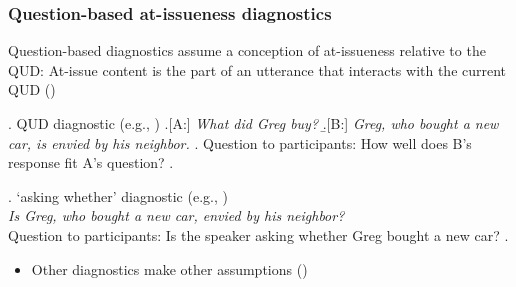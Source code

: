 \documentclass[compress, xcolor = dvipsnames, aspectratio=169]{beamer}
\begin{document}
	\begin{frame}[t]\frametitle{Question-based at-issueness diagnostics}\small

		Question-based diagnostics assume a conception of at-issueness relative to the QUD: At-issue content is the part of an utterance that interacts with the current QUD (\citealt{amaral_review_2007,simons_what_2010})\pause

		\ex. \label{qud}%
		    QUD diagnostic (e.g., \citealt{tonhauser_diagnosing_2012,chen_presuppositions_2024})
		    \a.[A:] \emph{What did Greg buy?}
		    \b.[B:] \emph{Greg, who bought a new car, is envied by his neighbor.}
		    \z.
		    Question to participants: How well does B's response fit A's question?\pause
		  \z.

		  \ex. \label{aw}%
		    `asking whether' diagnostic (e.g., \citealt{tonhauser_how_2018,solstad_cataphoric_2024})\smallskip\\
		      \emph{Is Greg, who bought a new car, envied by his neighbor?}\smallskip
		  \\ Question to participants: Is the speaker asking whether Greg bought a new car?\pause
		  \z.


		\begin{itemize}
			\item Other diagnostics make other assumptions
			(\citealt{snider_anaphoric_2017,snider_at-issuenessne_2017,snider_distinguishing_2018,koev_notions_2018,faller_discourse_2019,korotkova_evidential_2020})
		\end{itemize}
	
	\end{frame}
\end{document}
